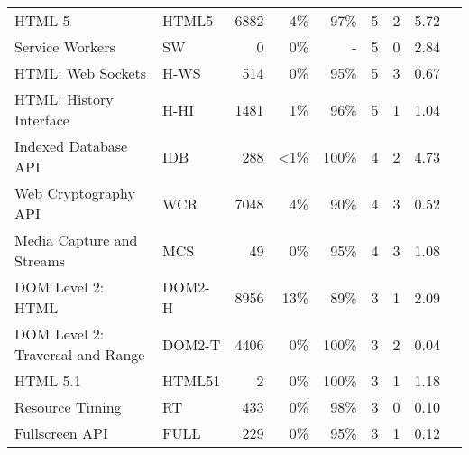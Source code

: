 \begin{table}[ht]
{\begin{tabular}{ l | l r r r | r r | r | l }
      HTML 5                                              &  HTML5       & 6882  & 4\%          & 97\%  & 5   & 2  & 5.72  & \\ %
      Service Workers                                     &  SW          & 0     & 0\%          & -     & 5   & 0  & 2.84  & \cite{van2016request,gelernter2015cross,van2015clock} \\ %
      HTML: Web Sockets                                   &  H-WS        & 514   & 0\%          & 95\%  & 5   & 3  & 0.67  & \\ %
      HTML: History Interface                             &  H-HI        & 1481  & 1\%          & 96\%  & 5   & 1  & 1.04  & \\ %
      Indexed Database API                                &  IDB         & 288   & \textless1\% & 100\% & 4   & 2  & 4.73  & \cite{alaca2016device,acar2014web} \\ %
      Web Cryptography API                                &  WCR         & 7048  & 4\%          & 90\%  & 4   & 3  & 0.52  & \\ %
      Media Capture and Streams                           &  MCS         & 49    & 0\%          & 95\%  & 4   & 3  & 1.08  & \cite{tian2014all} \\ %
      DOM Level 2: HTML                                   &  DOM2-H      & 8956  & 13\%         & 89\%  & 3   & 1  & 2.09  & \\ %
      DOM Level 2: Traversal and Range                    &  DOM2-T      & 4406  & 0\%          & 100\% & 3   & 2  & 0.04  & \\ %
      HTML 5.1                                            &  HTML51      & 2     & 0\%          & 100\% & 3   & 1  & 1.18  & \\ %
      Resource Timing                                     &  RT          & 433   & 0\%          & 98\%  & 3   & 0  & 0.10  & \\ %
      Fullscreen API                                      &  FULL        & 229   & 0\%          & 95\%  & 3   & 1  & 0.12  & \\ %

\end{tabular}}
\end{table}
